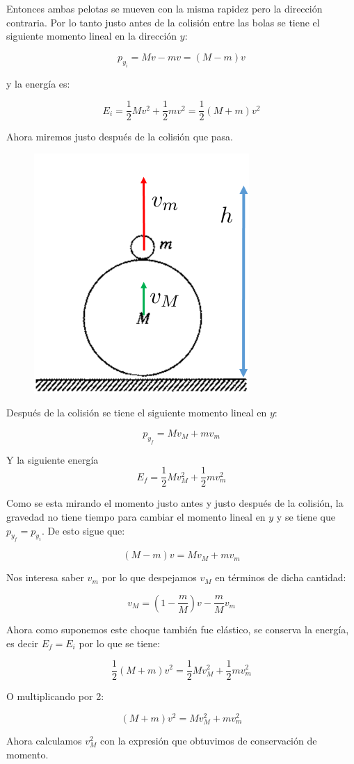 \documentclass[a4paper,11pt]{article}
\theoremstyle{mytheor}
\begin{document}
Entonces ambas pelotas se mueven con la misma rapidez pero la dirección contraria. Por lo tanto justo antes de la colisión entre las bolas se tiene el siguiente momento lineal en la dirección $y$:

$$ p_{y_i} = M v - m v = (M-m)v$$

y la energía es:

$$ E_i= \frac{1}{2} M v^2 + \frac{1}{2} m v^2 = \frac{1}{2} (M+m) v^2 $$

Ahora miremos justo después de la colisión que pasa.

\begin{figure}[h]
	\includegraphics[width=.3\linewidth]{3}
	\label{fcN4}
\end{figure}

Después de la colisión se tiene el siguiente momento lineal en $y$:


$$ p_{y_f} = M v_M + m v_m $$

Y la siguiente energía
$$ E_f= \frac{1}{2} M v_M^2 + \frac{1}{2} m v_m^2 $$

Como se esta mirando el momento justo antes y justo después de la colisión, la gravedad no tiene tiempo para cambiar el momento lineal en $y$ y se tiene que $p_{y_f} = p_{y_i} $. De esto sigue que:

$$ (M-m)v = M v_M + m v_m $$


Nos interesa saber $v_m$ por lo que despejamos $v_M$ en términos de dicha cantidad:


$$  v_M =  \left(1-\frac{m}{M}\right)v -  \frac{m}{M} v_m $$


Ahora como suponemos este choque también fue elástico, se conserva la energía, es decir $E_f = E_i$ por lo que se tiene:

$$ \frac{1}{2} (M+m) v^2 = \frac{1}{2} M v_M^2 + \frac{1}{2} m v_m^2 $$

O multiplicando por 2:

$$  (M+m) v^2 =  M v_M^2 +  m v_m^2 $$


Ahora calculamos $v_M^2$ con la expresión que obtuvimos de conservación de momento.
\end{document}
